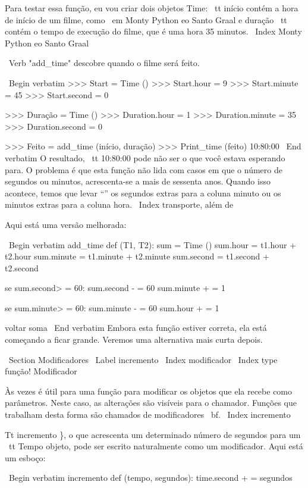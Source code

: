 \documentclass[10pt]{book}
\begin{document}
\begin {itemize}
{{{{{{{{{{{{{Para testar essa função, eu vou criar dois objetos Time: {\ tt início}
contém a hora de início de um filme, como {\ em Monty Python eo
Santo Graal} e {duração \ tt} contém o tempo de execução do filme,
que é uma hora 35 minutos.
\ Index {Monty Python eo Santo Graal}

\ Verb "add_time" descobre quando o filme será feito.

\ Begin {verbatim}
>>> Start = Time ()
>>> Start.hour = 9
>>> Start.minute = 45
>>> Start.second = 0

>>> Duração = Time ()
>>> Duration.hour = 1
>>> Duration.minute = 35
>>> Duration.second = 0

>>> Feito = add_time (início, duração)
>>> Print_time (feito)
10:80:00
\ End {verbatim}
%
O resultado, {\ tt 10:80:00} pode não ser o que você estava esperando
para. O problema é que esta função não lida com casos em que o
número de segundos ou minutos, acrescenta-se a mais de sessenta anos. Quando isso
acontece, temos que levar ``'' os segundos extras para a coluna minuto
ou os minutos extras para a coluna hora.
\ Index {transporte, além de}

Aqui está uma versão melhorada:

\ Begin {verbatim}
add_time def (T1, T2):
    sum = Time ()
    sum.hour = t1.hour + t2.hour
    sum.minute = t1.minute + t2.minute
    sum.second = t1.second + t2.second

    se sum.second> = 60:
        sum.second - = 60
        sum.minute + = 1

    se sum.minute> = 60:
        sum.minute - = 60
        sum.hour + = 1

    voltar soma
\ End {verbatim}
%
Embora esta função estiver correta, ela está começando a ficar grande.
Veremos uma alternativa mais curta depois.


\ Section {} Modificadores
\ Label {incremento}
\ Index {} modificador
\ Index {type função! Modificador}

Às vezes é útil para uma função para modificar os objetos que ela recebe como
parâmetros. Neste caso, as alterações são visíveis para o chamador.
Funções que trabalham desta forma são chamados de modificadores {\ bf}.
\ Index {incremento}

{Tt incremento \}, o que acrescenta um determinado número de segundos para um {\ tt Tempo}
objeto, pode ser escrito naturalmente como um
modificador. Aqui está um esboço:

\ Begin {verbatim}
incremento def (tempo, segundos):
    time.second + = segundos

}}}}}}}}}}}}}}
\end{itemize}
\end{document}
